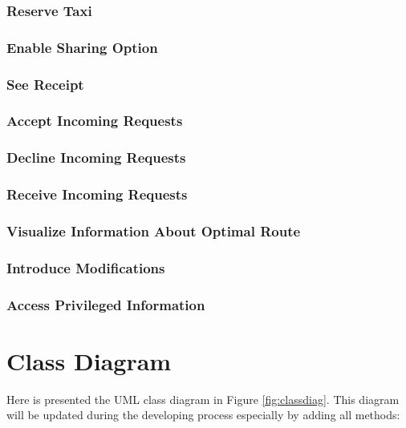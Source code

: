 \subsubsection{Reserve Taxi}

\subsubsection{Enable Sharing Option}

\subsubsection{See Receipt}

\subsubsection{Accept Incoming Requests}

\subsubsection{Decline Incoming Requests}

\subsubsection{Receive Incoming Requests}

\subsubsection{Visualize Information About Optimal Route}

\subsubsection{Introduce Modifications}

\subsubsection{Access Privileged Information}

\section{Class Diagram}
Here is presented the UML class diagram in Figure \ref{fig:classdiag}. This diagram will be updated during the developing process especially by adding all methods:

